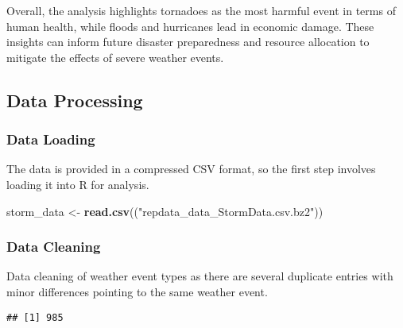 \documentclass[
]{article}
\newenvironment{Shaded}{\begin{snugshade}}{\end{snugshade}}
\newcommand{\CommentTok}[1]{\textcolor[rgb]{0.56,0.35,0.01}{\textit{#1}}}
\newcommand{\FunctionTok}[1]{\textcolor[rgb]{0.13,0.29,0.53}{\textbf{#1}}}
\newcommand{\NormalTok}[1]{#1}
\newcommand{\OtherTok}[1]{\textcolor[rgb]{0.56,0.35,0.01}{#1}}
\newcommand{\SpecialCharTok}[1]{\textcolor[rgb]{0.81,0.36,0.00}{\textbf{#1}}}
\newcommand{\StringTok}[1]{\textcolor[rgb]{0.31,0.60,0.02}{#1}}
\begin{document}
Overall, the analysis highlights tornadoes as the most harmful event in
terms of human health, while floods and hurricanes lead in economic
damage. These insights can inform future disaster preparedness and
resource allocation to mitigate the effects of severe weather events.

\hypertarget{data-processing}{%
\subsection{Data Processing}\label{data-processing}}

\hypertarget{data-loading}{%
\subsubsection{Data Loading}\label{data-loading}}

The data is provided in a compressed CSV format, so the first step
involves loading it into R for analysis.

\begin{Shaded}
\begin{Highlighting}[]
\NormalTok{storm\_data }\OtherTok{\textless{}{-}} \FunctionTok{read.csv}\NormalTok{((}\StringTok{"repdata\_data\_StormData.csv.bz2"}\NormalTok{))}
\end{Highlighting}
\end{Shaded}

\hypertarget{data-cleaning}{%
\subsubsection{Data Cleaning}\label{data-cleaning}}

Data cleaning of weather event types as there are several duplicate
entries with minor differences pointing to the same weather event.

\begin{Shaded}
\end{Shaded}

\begin{verbatim}
## [1] 985
\end{verbatim}
\end{document}
